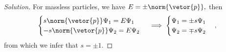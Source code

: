 \begin{proof}[Solution]
   For massless particles, we have \(E = \pm\norm{\vetor{p}},\) then
   \begin{equation*}
       \begin{cases}
          s \norm{\vetor{p}} \Psi_1 = E \Psi_1\\
          - s \norm{\vetor{p}} \Psi_2 = E \Psi_2
       \end{cases} \implies 
       \begin{cases}
          \Psi_1 = \pm s \Psi_1\\
          \Psi_2 = \mp s \Psi_2
       \end{cases},
   \end{equation*}
   from which we infer that \(s = \pm1.\)


\end{proof}
